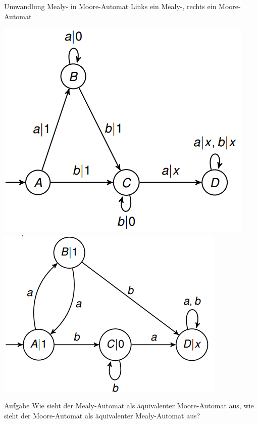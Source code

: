 \begin{frame}{Umwandlung Mealy- in Moore-Automat}
	Links ein Mealy-, rechts ein Moore-Automat
	
	\includegraphics[scale=0.5]{images/MealyBsp.png} \pause
	\includegraphics[scale=0.5]{images/MooreBsp.png} \pause
	
	\begin{taskblock}{Aufgabe}
		Wie sieht der Mealy-Automat als äquivalenter Moore-Automat aus, wie sieht der Moore-Automat als äquivalenter Mealy-Automat aus?
	\end{taskblock}
\end{frame}

